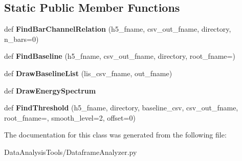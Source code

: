 \subsection*{Static Public Member Functions}
\begin{DoxyCompactItemize}
\item 
\mbox{\label{classMIS_1_1DataAnalysisTools_1_1DataframeAnalyzer_1_1DataframeAnalyzer_a03332f9c42938e4d099b0a327eb40f77}} 
def {\bfseries Find\+Bar\+Channel\+Relation} (h5\+\_\+fname, csv\+\_\+out\+\_\+fname, directory, n\+\_\+bars=0)
\item 
\mbox{\label{classMIS_1_1DataAnalysisTools_1_1DataframeAnalyzer_1_1DataframeAnalyzer_a13c814ccb61b4bde2bdcb5dc8ab1fb13}} 
def {\bfseries Find\+Baseline} (h5\+\_\+fname, csv\+\_\+out\+\_\+fname, directory, root\+\_\+fname=\textquotesingle{}\textquotesingle{})
\item 
\mbox{\label{classMIS_1_1DataAnalysisTools_1_1DataframeAnalyzer_1_1DataframeAnalyzer_a100d01bb691d650c1249dc0acf2c4db5}} 
def {\bfseries Draw\+Baseline\+List} (lis\+\_\+csv\+\_\+fname, out\+\_\+fname)
\item 
\mbox{\label{classMIS_1_1DataAnalysisTools_1_1DataframeAnalyzer_1_1DataframeAnalyzer_af69d2185dc6c1f0e45b99c762a5e35a3}} 
def {\bfseries Draw\+Energy\+Spectrum}
\item 
\mbox{\label{classMIS_1_1DataAnalysisTools_1_1DataframeAnalyzer_1_1DataframeAnalyzer_a5dc4ca898279d5adff0f80ab8a61f5f8}} 
def {\bfseries Find\+Threshold} (h5\+\_\+fname, directory, baseline\+\_\+csv, csv\+\_\+out\+\_\+fname, root\+\_\+fname=\textquotesingle{}\textquotesingle{}, smooth\+\_\+level=2, offset=0)
\end{DoxyCompactItemize}


The documentation for this class was generated from the following file\+:\begin{DoxyCompactItemize}
\item 
Data\+Analysis\+Tools/Dataframe\+Analyzer.\+py\end{DoxyCompactItemize}

